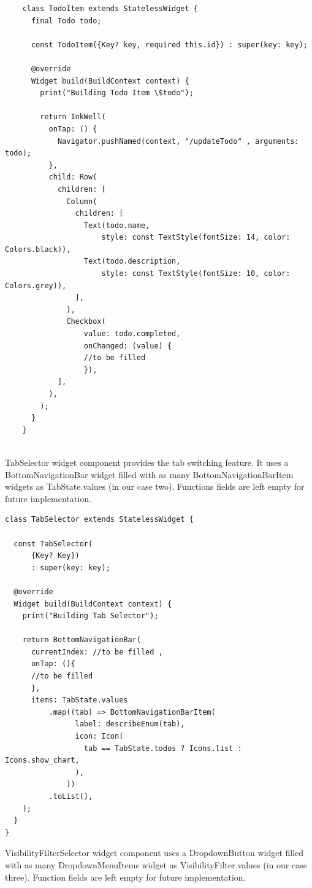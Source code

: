 	\mbox{}
	\begin{code}
	 \mbox{}
			\label{code:2.10}
	\begin{verbatim}
	class TodoItem extends StatelessWidget {
	  final Todo todo;
	
	  const TodoItem({Key? key, required this.id}) : super(key: key);
	
	  @override
	  Widget build(BuildContext context) {
	    print("Building Todo Item \$todo");
	
	    return InkWell(
	      onTap: () {
	        Navigator.pushNamed(context, "/updateTodo" , arguments: todo);
	      },
	      child: Row(
	        children: [
	          Column(
	            children: [
	              Text(todo.name,
	                  style: const TextStyle(fontSize: 14, color: Colors.black)),
	              Text(todo.description,
	                  style: const TextStyle(fontSize: 10, color: Colors.grey)),
	            ],
	          ),
	          Checkbox(
	              value: todo.completed,
	              onChanged: (value) {
	              //to be filled
	              }),
	        ],
	      ),
	    );
	  }
	}
	
	\end{verbatim}
	\end{code}	
TabSelector widget component provides the tab switching feature. It uses a BottomNavigationBar widget filled with as many BottomNavigationBarItem widgets as TabState.values (in our case two). Functions fields are left empty for future implementation.
	
	\mbox{}
	\begin{code}
	 \mbox{}
			\label{code:2.11}
	\begin{verbatim}
class TabSelector extends StatelessWidget {

  const TabSelector(
      {Key? Key})
      : super(key: key);

  @override
  Widget build(BuildContext context) {
    print("Building Tab Selector");

    return BottomNavigationBar(
      currentIndex: //to be filled ,
      onTap: (){
      //to be filled
      },
      items: TabState.values
          .map((tab) => BottomNavigationBarItem(
                label: describeEnum(tab),
                icon: Icon(
                  tab == TabState.todos ? Icons.list : Icons.show_chart,
                ),
              ))
          .toList(),
    );
  }
}

	\end{verbatim}
	\end{code}
VisibilityFilterSelector widget component uses a DropdownButton widget filled with as many DropdownMenuItems widget as VisibilityFilter.values (in our case three). Function fields are left empty for future implementation.
	
